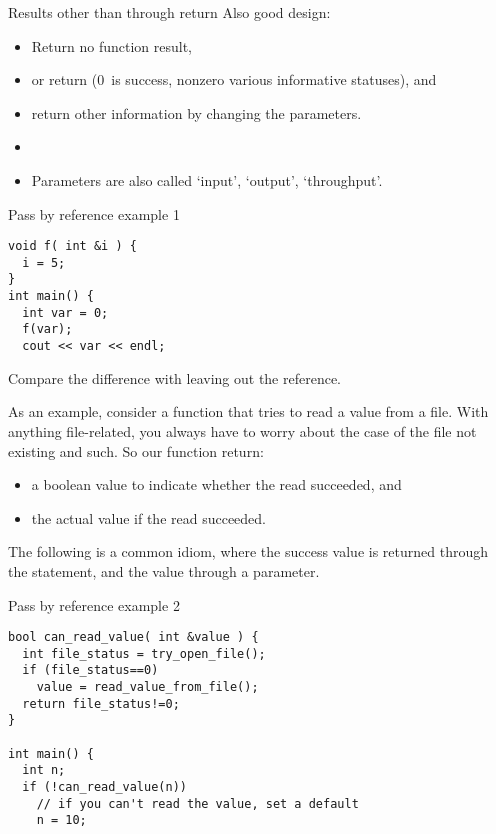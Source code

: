 \begin{slide}{Results other than through return}
  \label{sl:func-err-return}
  Also good design:
  \begin{itemize}
  \item Return no function result,
  \item or return  (0~is success, nonzero various
    informative statuses), and
  \item return other information by changing the parameters.
  \item {}
  \item Parameters are also called `input', `output', `throughput'.
  \end{itemize}
\end{slide}

\begin{block}{Pass by reference example 1}
  \label{sl:pass-reference1}
\begin{verbatim}
void f( int &i ) {
  i = 5;
}
int main() {
  int var = 0;
  f(var);
  cout << var << endl;
\end{verbatim}
Compare the difference with leaving out the reference.
\end{block}

As an example, consider a function that tries to read a value from a
file. With anything file-related, you always have to worry about the
case of the file not existing and such. So our function return:
\begin{itemize}
\item a boolean value to indicate whether the read succeeded, and
\item the actual value if the read succeeded.
\end{itemize}
The following is a common idiom, where the success value is returned
through the  statement, and the value through a parameter.

\begin{block}{Pass by reference example 2}
  \label{sl:pass-reference2}
\begin{verbatim}
bool can_read_value( int &value ) {
  int file_status = try_open_file();
  if (file_status==0) 
    value = read_value_from_file();
  return file_status!=0;
}

int main() {
  int n;
  if (!can_read_value(n))
    // if you can't read the value, set a default
    n = 10;
\end{verbatim}
\end{block}

